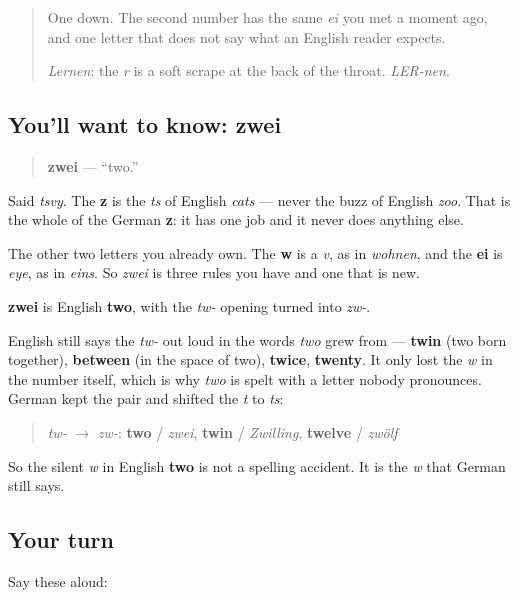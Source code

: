 \begin{quote}
One down. The second number has the same \emph{ei} you met a moment ago, and one letter that does not say what an English reader expects.

\emph{Lernen}: the \emph{r} is a soft scrape at the back of the throat. \emph{LER-nen}.
\end{quote}

\subsection*{You'll want to know: zwei}
\begin{quote}
\textbf{zwei} — \textquotedblleft{}two.\textquotedblright{}
\end{quote}

Said \emph{tsvy}. The \textbf{z} is the \emph{ts} of English \emph{cats} — never the buzz of English \emph{zoo}. That is the whole of the German \textbf{z}: it has one job and it never does anything else.

The other two letters you already own. The \textbf{w} is a \emph{v}, as in \emph{wohnen}, and the \textbf{ei} is \emph{eye}, as in \emph{eins}. So \emph{zwei} is three rules you have and one that is new.

\begin{cousinweb}
\textbf{zwei} is English \textbf{two}, with the \emph{tw-} opening turned into \emph{zw-}.

English still says the \emph{tw-} out loud in the words \emph{two} grew from — \textbf{twin} (two born together), \textbf{between} (in the space of two), \textbf{twice}, \textbf{twenty}. It only lost the \emph{w} in the number itself, which is why \emph{two} is spelt with a letter nobody pronounces. German kept the pair and shifted the \emph{t} to \emph{ts}:

\begin{quote}
\emph{tw-} $\to$ \emph{zw-}: \textbf{two} / \emph{zwei}, \textbf{twin} / \emph{Zwilling}, \textbf{twelve} / \emph{zwölf}
\end{quote}

So the silent \emph{w} in English \textbf{two} is not a spelling accident. It is the \emph{w} that German still says.
\end{cousinweb}

\subsection*{Your turn}
Say these aloud:

